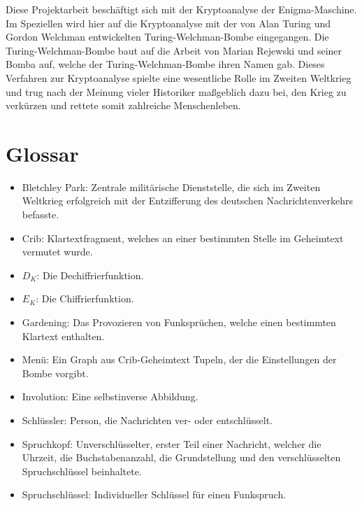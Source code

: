 \documentclass[ngerman, a4paper, justified, nobib, notoc, sfsidenotes]{tufte-book}
\begin{document}
	Diese Projektarbeit beschäftigt sich mit der Kryptoanalyse der Enigma-Maschine.
	Im Speziellen wird hier auf die Kryptoanalyse mit der von Alan Turing und Gordon Welchman entwickelten \glqq Turing-Welchman-Bombe\grqq{} eingegangen.
	Die Turing-Welchman-Bombe baut auf die Arbeit von Marian Rejewski und seiner \glqq Bomba\grqq{} auf, welche der Turing-Welchman-Bombe ihren Namen gab.
	Dieses Verfahren zur Kryptoanalyse spielte eine wesentliche Rolle im Zweiten Weltkrieg und trug nach der Meinung vieler Historiker maßgeblich dazu bei, den Krieg zu verkürzen und rettete somit zahlreiche Menschenleben.
	
	\mainmatter
	
	
	
	
	
	
	
	
	
	\backmatter
	\pagestyle{empty}
	\clearpage
	\chapter*{Glossar}\label{sec:glossar}
	\begin{itemize}
		\item Bletchley Park: Zentrale militärische Dienststelle, die sich im Zweiten Weltkrieg erfolgreich mit der Entzifferung des deutschen Nachrichtenverkehrs befasste.
		\item Crib: Klartextfragment, welches an einer bestimmten Stelle im Geheimtext vermutet wurde.
		\item $D_K$: Die Dechiffrierfunktion.
		\item $E_K$: Die Chiffrierfunktion.
		\item Gardening: Das Provozieren von Funksprüchen, welche einen bestimmten Klartext enthalten.
		\item Menü: Ein Graph aus Crib-Geheimtext Tupeln, der die Einstellungen der Bombe vorgibt.
		\item Involution: Eine selbstinverse Abbildung.
		\item Schlüssler: Person, die Nachrichten ver- oder entschlüsselt.
		\item Spruchkopf: Unverschlüsselter, erster Teil einer Nachricht, welcher die Uhrzeit, die Buchstabenanzahl, die Grundstellung und den verschlüsselten Spruchschlüssel beinhaltete.
		\item Spruchschlüssel:  Individueller Schlüssel für einen Funkspruch.
	\end{itemize}
	\clearpage
	
\end{document}
